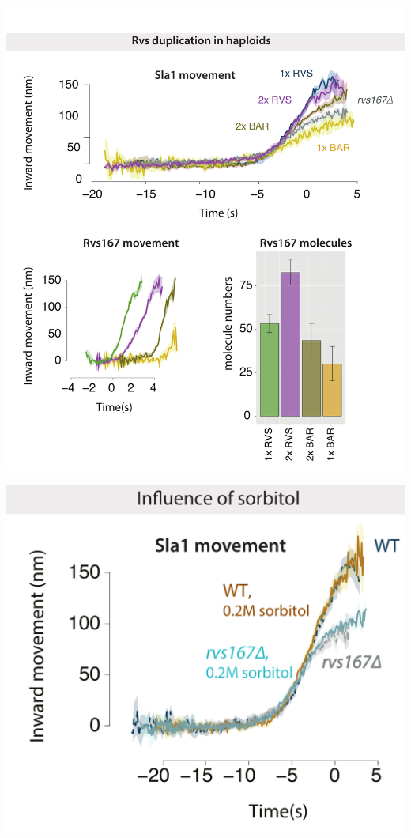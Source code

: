 	\includegraphics[width=23cm,height=23 cm,keepaspectratio]{figures/results_final/scaffolding}
	
	\includegraphics[width=14cm,height=14 cm,keepaspectratio]{figures/results_final/sorbitol}